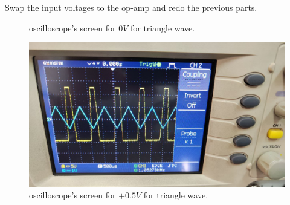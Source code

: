 \documentclass[11pt]{article}
\newcommand{\PicScale}{0.2}
\begin{document}
\begin{question}
\begin{subquestion}{Swap the input voltages to the op-amp and redo the previous parts.}
{\begin{figure}[H]
                    \caption{oscilloscope's screen for $0V$ for triangle wave.}
                \end{figure}
                \begin{figure}[H]
                    \centering
                    \includegraphics[scale=\PicScale,angle=0]{Fig/54.jpeg}
                    \caption{oscilloscope's screen for $+0.5V$ for triangle wave.}
                \end{figure}
        }
    \end{subquestion}


\end{question}

\end{document}
